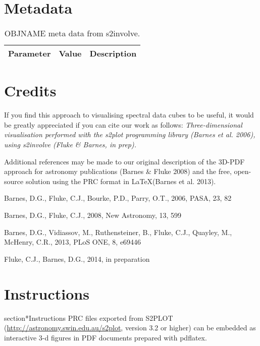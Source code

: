 \documentclass{article}
\begin{document}
\section{Metadata}

\begin{table}[h]
\caption{{OBJNAME} meta data from {\sc s2involve}.}
\label{tbl:meta}
\begin{center}
\begin{tabular}{lrl}
{\bf Parameter} & {\bf Value} & {\bf Description}\\
\hline 

\hline
\end{tabular}
\end{center}
\end{table}

\section*{Credits}
If you find this approach to visualising spectral data cubes to be useful, 
it would be greatly appreciated if you can cite our work as follows:
{\em Three-dimensional visualisation performed with the {\sc s2plot} programming 
library (Barnes et al. 2006), using {\sc s2involve} (Fluke \& Barnes, {\em in prep}).}

Additional references may be made to our original description of the 3D-PDF approach
for astronomy publications (Barnes \& Fluke 2008) and the free, open-source solution 
using the PRC format in \LaTeX (Barnes et al. 2013). 


\begin{thebibliography}{99}
Barnes, D.G., Fluke, C.J., Bourke, P.D., Parry, O.T., 2006, PASA, 23, 82

Barnes, D.G., Fluke, C.J., 2008, New Astronomy, 13, 599 

Barnes, D.G., Vidiassov, M., Ruthensteiner, B., Fluke, C.J., Quayley, M., McHenry, C.R., 2013, PLoS ONE, 8, e69446

Fluke, C.J., Barnes, D.G., 2014, in preparation

\end{thebibliography}

\newpage
\appendix
\section*{Instructions}
section*{Instructions}
PRC files exported from S2PLOT (\url{http://astronomy.swin.edu.au/s2plot},
version 3.2 or higher) can be embedded as interactive 3-d figures in PDF documents
prepared with {\sc pdflatex}.
\end{document}
